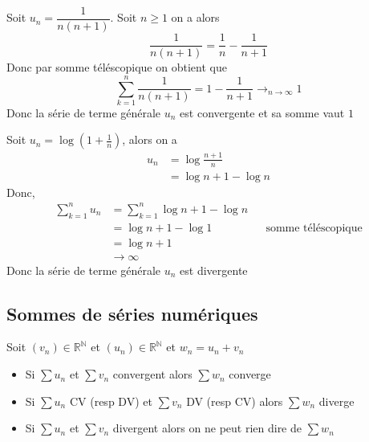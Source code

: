 \documentclass[11pt,colorlinks]{book}
\theoremstyle{mytheoremstyle}
\theoremstyle{mytheoremstyle}
\theoremstyle{mytheoremstyle}
\theoremstyle{mytheoremstyle}
\theoremstyle{mytheoremstyle}
\theoremstyle{mytheoremstyle}
\theoremstyle{mytheoremstyle}
\theoremstyle{mytheoremstyle}
\theoremstyle{myproblemstyle}
\def\mbb#1{\mathbb{#1}}
\def\bN{\mbb{N}}
\def\bR{\mbb{R}}
\def\rN{\bR^{\bN}}
\begin{document}
\begin{ex}
  Soit $u_n = \dfrac{1}{n(n+1)}$. Soit $n \geq 1$ on a alors
  \begin{equation*}
    \dfrac{1}{n(n+1)} = \dfrac{1}{n} - \dfrac{1}{n+1}
  \end{equation*}
  Donc par somme téléscopique on obtient que 
  \begin{equation*}
    \sum_{k=1}^{n} \dfrac{1}{n(n+1)} = 1 - \dfrac{1}{n+1} \to_{n \to \infty} 1 
  \end{equation*}
  Donc la série de terme générale $u_n$ est convergente et sa somme vaut $1$
\end{ex}
\begin{ex}
  Soit $u_n = \log \left(1 + \frac{1}{n}\right)$, alors on a 
  \begin{align*}
    u_n &= \log \frac{n+1}{n} \\ 
        &= \log n+1 - \log n
  \end{align*}
  Donc,
  \begin{align*}
    \sum_{k=1}^{n} u_n &= \sum_{k=1}^n \log n+1 - \log n \\
                       &= \log n+1 - \log 1 && \text{somme téléscopique} \\ 
                       &= \log n+1 \\
                       &\to \infty
  \end{align*}
  Donc la série de terme générale $u_n$ est divergente
\end{ex}
\subsection{Sommes de séries numériques}
\begin{prop}[Somme]
  Soit $(v_n) \in \rN$ et $(u_n) \in \rN$ et $w_n = u_n + v_n$ 
  \begin{itemize}
    \item Si $\sum u_n$ et $\sum v_n$ convergent alors $\sum w_n$ converge
    \item Si $\sum u_n$ CV (resp DV) et $\sum v_n$ DV (resp CV) alors $\sum w_n$ diverge
    \item Si $\sum u_n$ et $\sum v_n$ divergent alors on ne peut rien dire de $\sum w_n$
  \end{itemize}
\end{prop}
\end{document}
